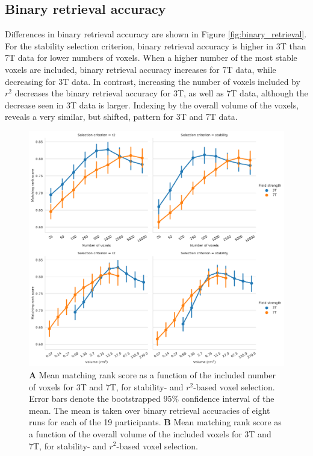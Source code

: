 \subsection*{Binary retrieval accuracy}

Differences in binary retrieval accuracy are shown in Figure
\ref{fig:binary_retrieval}. For the stability selection criterion, binary retrieval
accuracy is higher in 3T than 7T data for lower numbers of voxels.
When a higher number of the most stable voxels are included, binary retrieval
accuracy increases for 7T data, while decreasing for 3T data. In
contrast, increasing the number of voxels included by $r^2$ decreases the
binary retrieval accuracy for 3T, as well as 7T data, although the
decrease seen in 3T data is larger. Indexing by the overall volume of the voxels, reveals a very similar,
but shifted, pattern for 3T and 7T data.

\begin{figure}
  \centering
    \includegraphics[width=\linewidth]{pics/rank.pdf}
	
  \caption{\textbf{A} Mean matching rank score as a function of the included number
  of voxels for 3T and 7T, for stability- and $r^2$-based voxel selection.
  Error bars denote the bootstrapped 95\% confidence interval of the mean. The
  mean is taken over binary retrieval accuracies of eight runs for each of the
  19 participants. \textbf{B} Mean matching rank score as a function of the overall
volume of the included voxels for 3T and 7T, for stability- and
$r^2$-based voxel selection.}

 \label{fig:matching_score}
\end{figure}

